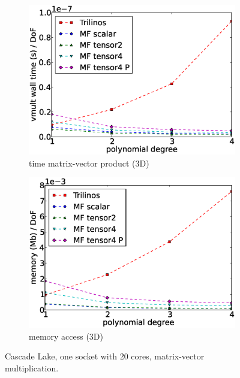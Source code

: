 \documentclass[AMA,STIX1COL]{WileyNJD-v2}
\begin{document}
\begin{figure}
\begin{subfigure}[b]{0.32\textwidth}
    \includegraphics[width=\textwidth]{CSL_Munich_timing3d.eps}
    \caption{time matrix-vector product (3D)}
    \label{fig:benchmark_miehe_CSL_vmult3}
  \end{subfigure}
  \begin{subfigure}[b]{0.32\textwidth}
    \centering
    \includegraphics[width=\textwidth]{CSL_Munich_memory3d.eps}
    \caption{memory access (3D)}
    \label{fig:benchmark_miehe_CSL_memory3}
  \end{subfigure}
  \caption{Cascade Lake, one socket with 20 cores, matrix-vector multiplication.}%
  \label{fig:benchmark_miehe_CSL}
\end{figure}
\end{document}
